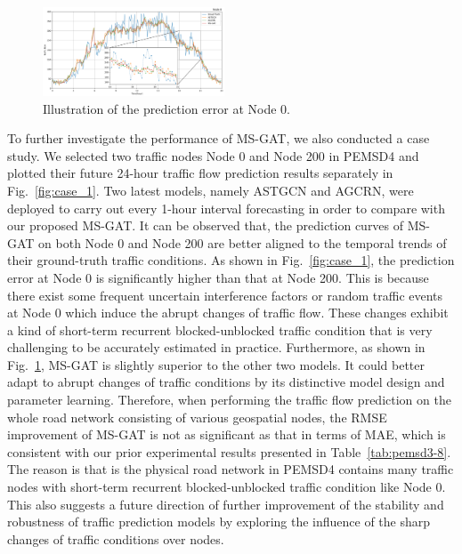 \begin{figure}[!ht]
    \centering
    \includegraphics[width=0.48\textwidth]{pictures/Case_2.png}
    \caption{Illustration of the prediction error at Node 0.}
    \label{fig:case_2}
\end{figure}

To further investigate the performance of MS-GAT, we also conducted a case study. We selected two traffic nodes Node 0 and Node 200 in PEMSD4 and plotted their future 24-hour traffic flow prediction results separately in Fig.~\ref{fig:case_1}. Two latest models, namely ASTGCN and AGCRN, were deployed to carry out every 1-hour interval forecasting in order to compare with our proposed MS-GAT. It can be observed that, the prediction curves of MS-GAT on both Node 0 and Node 200 are better aligned to the temporal trends of their ground-truth traffic conditions. As shown in Fig.~\ref{fig:case_1}, the prediction error at Node 0 is significantly higher than that at Node 200. This is because there exist some frequent uncertain interference factors or random traffic events at Node 0 which induce the abrupt changes of traffic flow. These changes exhibit a kind of short-term recurrent blocked-unblocked traffic condition that is very challenging to be accurately estimated in practice. Furthermore, as shown in Fig.~\ref{fig:case_2}, MS-GAT is slightly superior to the other two models. It could better adapt to abrupt changes of traffic conditions by its distinctive model design and parameter learning. Therefore, when performing the traffic flow prediction on the whole road network consisting of various geospatial nodes, the RMSE improvement of MS-GAT is not as significant as that in terms of MAE, which is consistent with our prior experimental results presented in Table~\ref{tab:pemsd3-8}. The reason is that is the physical road network in PEMSD4 contains many traffic nodes with short-term recurrent blocked-unblocked traffic condition like Node 0. This also suggests a future direction of further improvement of the stability and robustness of traffic prediction models by exploring the influence of the sharp changes of traffic conditions over nodes.